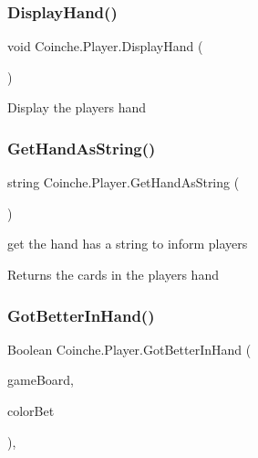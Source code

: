 \subsubsection{\texorpdfstring{Display\+Hand()}{DisplayHand()}}
{\footnotesize\ttfamily void Coinche.\+Player.\+Display\+Hand (\begin{DoxyParamCaption}{ }\end{DoxyParamCaption})\hspace{0.3cm}{\ttfamily [inline]}}



Display the player\textquotesingle{}s hand 

\mbox{\label{class_coinche_1_1_player_a837c604aef1f5845a0728b7b53facc94}} 
\subsubsection{\texorpdfstring{Get\+Hand\+As\+String()}{GetHandAsString()}}
{\footnotesize\ttfamily string Coinche.\+Player.\+Get\+Hand\+As\+String (\begin{DoxyParamCaption}{ }\end{DoxyParamCaption})\hspace{0.3cm}{\ttfamily [inline]}}



get the hand has a string to inform players 

\begin{DoxyReturn}{Returns}
the cards in the player\textquotesingle{}s hand
\end{DoxyReturn}
\mbox{\label{class_coinche_1_1_player_a8f04f1fb2e697163b2728450c3e24f31}} 
\subsubsection{\texorpdfstring{Got\+Better\+In\+Hand()}{GotBetterInHand()}}
{\footnotesize\ttfamily Boolean Coinche.\+Player.\+Got\+Better\+In\+Hand (\begin{DoxyParamCaption}\item[{\hyperlink{class_coinche_1_1_card}{Card} \mbox{[}$\,$\mbox{]}}]{game\+Board,  }\item[{Card\+Color}]{color\+Bet }\end{DoxyParamCaption})\hspace{0.3cm}{\ttfamily [inline]}, {\ttfamily [private]}}



